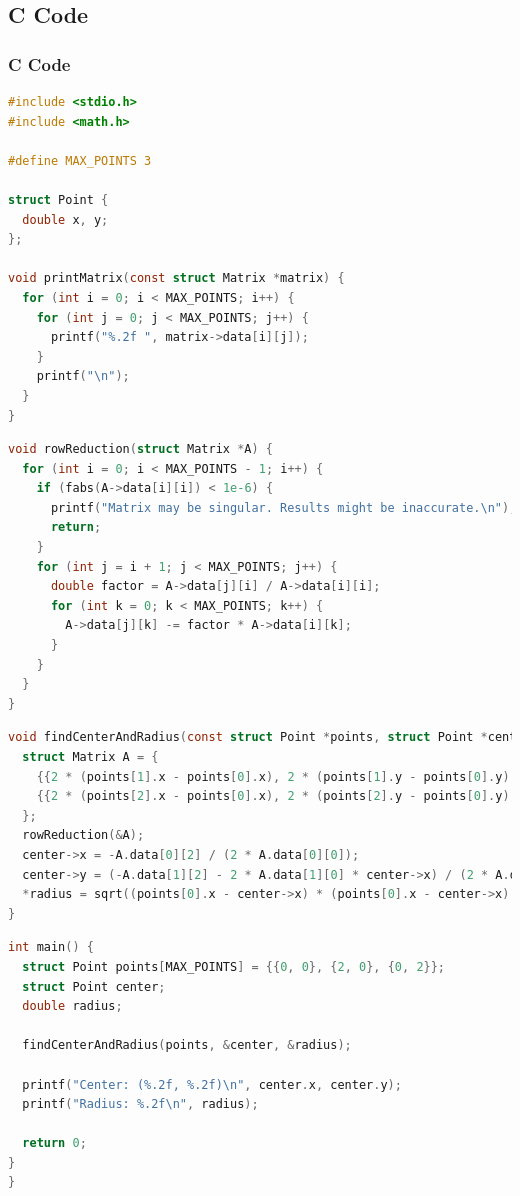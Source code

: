 \documentclass{beamer}
\theoremstyle{remark}
\numberwithin{equation}{section}
\begin{document}
\subsection{C Code}
\begin{frame}[fragile]
\frametitle{C Code}
\begin{lstlisting}[language=C]
#include <stdio.h>
#include <math.h>

#define MAX_POINTS 3

struct Point {
  double x, y;
};

void printMatrix(const struct Matrix *matrix) {
  for (int i = 0; i < MAX_POINTS; i++) {
    for (int j = 0; j < MAX_POINTS; j++) {
      printf("%.2f ", matrix->data[i][j]);
    }
    printf("\n");
  }
}
\end{lstlisting}
\end{frame}
\begin{frame}[fragile]
\begin{lstlisting}[language=C]
void rowReduction(struct Matrix *A) {
  for (int i = 0; i < MAX_POINTS - 1; i++) {
    if (fabs(A->data[i][i]) < 1e-6) {
      printf("Matrix may be singular. Results might be inaccurate.\n");
      return;
    }
    for (int j = i + 1; j < MAX_POINTS; j++) {
      double factor = A->data[j][i] / A->data[i][i];
      for (int k = 0; k < MAX_POINTS; k++) {
        A->data[j][k] -= factor * A->data[i][k];
      }
    }
  }
}
\end{lstlisting}
\end{frame}
\begin{frame}[fragile]
\begin{lstlisting}[language=C]
void findCenterAndRadius(const struct Point *points, struct Point *center, double *radius) {
  struct Matrix A = {
    {{2 * (points[1].x - points[0].x), 2 * (points[1].y - points[0].y), points[1].x * points[1].x - points[0].x * points[0].x + points[1].y * points[1].y - points[0].y * points[0].y}},
    {{2 * (points[2].x - points[0].x), 2 * (points[2].y - points[0].y), points[2].x * points[2].x - points[0].x * points[0].x + points[2].y * points[2].y - points[0].y * points[0].y}}
  };
  rowReduction(&A);
  center->x = -A.data[0][2] / (2 * A.data[0][0]);
  center->y = (-A.data[1][2] - 2 * A.data[1][0] * center->x) / (2 * A.data[1][1]);
  *radius = sqrt((points[0].x - center->x) * (points[0].x - center->x) + (points[0].y - center->y) * (points[0].y - center->y));
}
\end{lstlisting}
\end{frame}
\begin{frame}[fragile]
\begin{lstlisting}[language=C]
int main() {
  struct Point points[MAX_POINTS] = {{0, 0}, {2, 0}, {0, 2}};
  struct Point center;
  double radius;

  findCenterAndRadius(points, &center, &radius);

  printf("Center: (%.2f, %.2f)\n", center.x, center.y);
  printf("Radius: %.2f\n", radius);

  return 0;
}
}
\end{lstlisting}
\end{frame}
\end{document}
